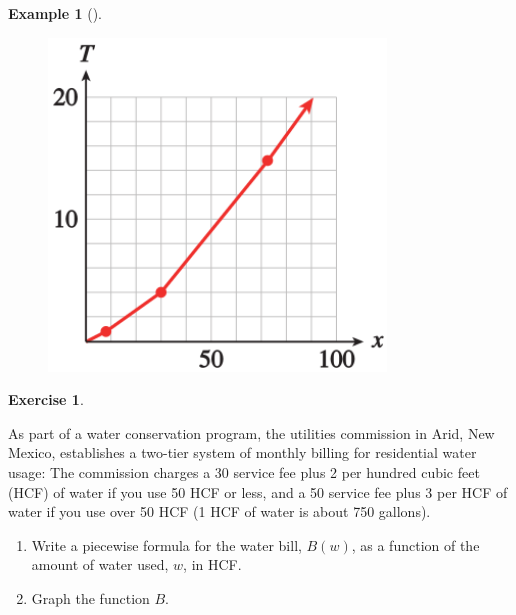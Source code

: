 \documentclass[10pt,]{book}
\theoremstyle{plain}
\theoremstyle{definition}
\newtheorem{exercise}[theorem]{Exercise}
\theoremstyle{definition}
\newtheorem{example}[theorem]{Example}
\numberwithin{equation}{section}
\begin{document}
\begin{example}[]
\begin{enumerate}[label=*\alph**]
\begin{figure}
\includegraphics[width=0.80\textwidth,]{images/fig-income-tax.svg}\caption{\label{fig-income-tax}}
\end{figure}
\end{enumerate}
\end{example}
\begin{exercise}\label{water-bill}

    As part of a water conservation program, the utilities commission in Arid, New Mexico, establishes a two-tier system of monthly billing for residential water usage: The commission charges a \textdollar{}30 service fee plus \textdollar{}2 per hundred cubic feet (HCF) of water if you use 50 HCF or less, and a \textdollar{}50 service fee plus \textdollar{}3 per HCF of water if you use over 50 HCF (1 HCF of water is about 750 gallons).
    \leavevmode%
\begin{enumerate}[label=*\alph**]
\item\hypertarget{li-341}{}Write a piecewise formula for the water bill, \(B(w)\), as a function of the amount of water used, \(w\), in HCF.\item\hypertarget{li-342}{}Graph the function \(B\).\end{enumerate}
\end{exercise}
\end{document}

